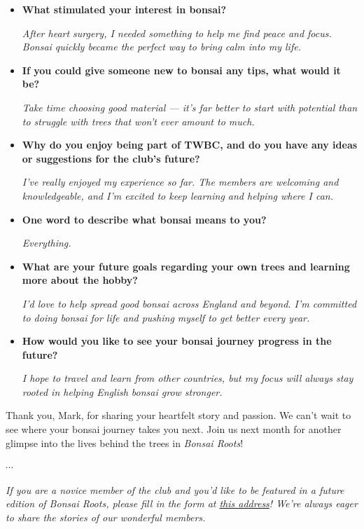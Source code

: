 \begin{itemize}
    \emph{For about four and a half years. It's been a steady and rewarding journey of discovery since then.}

    \item \textbf{What stimulated your interest in bonsai?}

    \emph{After heart surgery, I needed something to help me find peace and focus. Bonsai quickly became the perfect way to bring calm into my life.}

    \item \textbf{If you could give someone new to bonsai any tips, what would it be?}

    \emph{Take time choosing good material — it's far better to start with potential than to struggle with trees that won't ever amount to much.}

    \item \textbf{Why do you enjoy being part of TWBC, and do you have any ideas or suggestions for the club's future?}

    \emph{I've really enjoyed my experience so far. The members are welcoming and knowledgeable, and I'm excited to keep learning and helping where I can.}

    \item \textbf{One word to describe what bonsai means to you?}

    \emph{Everything.}

    \item \textbf{What are your future goals regarding your own trees and learning more about the hobby?}

    \emph{I'd love to help spread good bonsai across England and beyond. I'm committed to doing bonsai for life and pushing myself to get better every year.}

    \item \textbf{How would you like to see your bonsai journey progress in the future?}

    \emph{I hope to travel and learn from other countries, but my focus will always stay rooted in helping English bonsai grow stronger.}
\end{itemize}

Thank you, Mark, for sharing your heartfelt story and passion. We can't wait to see where your bonsai journey takes you next. Join us next month for another glimpse into the lives behind the trees in \emph{Bonsai Roots}!

\begin{center}
    $\cdots$
\end{center}

\noindent
\emph{If you are a novice member of the club and you'd like to be featured in a future edition of Bonsai Roots, please fill in the form at \href{https://forms.gle/quVXa4L8rhpnT5kr6}{this address}! We're always eager to share the stories of our wonderful members.}

\closearticle 
\columnbreak